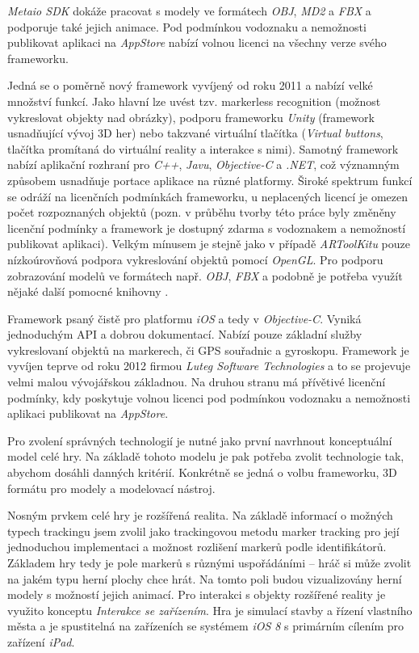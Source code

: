 \documentclass[twoside,12pt]{article}
\begin{document}
\textit{Metaio SDK} dokáže pracovat s modely ve formátech \textit{OBJ}, \textit{MD2} a \textit{FBX} a podporuje také jejich animace. Pod podmínkou vodoznaku a nemožnosti publikovat aplikaci na \textit{AppStore} nabízí volnou licenci na všechny verze svého frameworku. 

Jedná se o poměrně nový framework vyvíjený od roku 2011 a nabízí velké množství funkcí. Jako hlavní lze uvést tzv. markerless recognition (možnost vykreslovat objekty nad obrázky), podporu frameworku \textit{Unity} (framework usnadňující vývoj 3D her) nebo takzvané virtuální tlačítka (\textit{Virtual buttons}, tlačítka promítaná do virtuální reality a interakce s nimi). Samotný framework nabízí aplikační rozhraní pro \textit{C++}, \textit{Javu}, \textit{Objective-C} a \textit{.NET}, což významným způsobem usnadňuje portace aplikace na různé platformy. Široké spektrum funkcí se odráží na licenčních podmínkách frameworku, u neplacených licencí je omezen počet rozpoznaných objektů (pozn. v průběhu tvorby této práce byly změněny licenční podmínky a framework je dostupný zdarma s vodoznakem a nemožností publikovat aplikaci). Velkým mínusem je stejně jako v případě \textit{ARToolKitu} pouze nízkoúrovňová podpora vykreslování objektů pomocí \textit{OpenGL}. Pro podporu zobrazování modelů ve formátech např. \textit{OBJ}, \textit{FBX} a podobně je potřeba využít nějaké další pomocné knihovny \cite{vuforia_3dformats}.

Framework psaný čistě pro platformu \textit{iOS} a tedy v \textit{Objective-C}. Vyniká jednoduchým API a dobrou dokumentací. Nabízí pouze základní služby vykreslovaní objektů na markerech, či GPS souřadnic a gyroskopu. Framework je vyvíjen teprve od roku 2012 firmou \textit{Luteg Software Technologies} a to se projevuje velmi malou vývojářskou základnou. Na druhou stranu má přívětivé licenční podmínky, kdy poskytuje volnou licenci pod podmínkou vodoznaku a nemožnosti aplikaci publikovat na \textit{AppStore}. 

\newpage
{}
Pro zvolení správných technologií je nutné jako první navrhnout konceptuální model celé hry. Na základě tohoto modelu je pak potřeba zvolit technologie tak, abychom dosáhli danných kritérií. Konkrétně se jedná o volbu frameworku, 3D formátu pro modely a modelovací nástroj.

Nosným prvkem celé hry je rozšířená realita. Na základě informací o možných typech trackingu jsem zvolil jako trackingovou metodu marker tracking pro její jednoduchou implementaci a možnost rozlišení markerů podle identifikátorů. Základem hry tedy je pole markerů s různými uspořádáními -- hráč si může zvolit na jakém typu herní plochy chce hrát. Na tomto poli budou vizualizovány herní modely s možností jejich animací. Pro interakci s objekty rozšířené reality je využito konceptu \textit{Interakce se zařízením}. Hra je simulací stavby a řízení vlastního města a je spustitelná na zařízeních se systémem \textit{iOS 8} s primárním cílením pro zařízení \textit{iPad}. 
\end{document}
